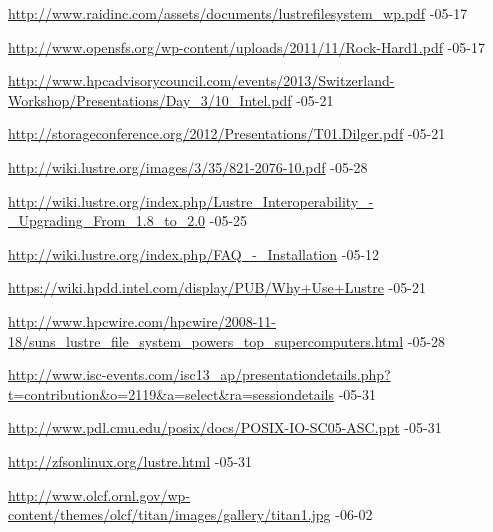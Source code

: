\begin{thebibliography}{1}
    \small

        \url{http://www.raidinc.com/assets/documents/lustrefilesystem_wp.pdf} -05-17

        \url{http://www.opensfs.org/wp-content/uploads/2011/11/Rock-Hard1.pdf} -05-17

        \url{http://www.hpcadvisorycouncil.com/events/2013/Switzerland-Workshop/Presentations/Day_3/10_Intel.pdf} -05-21

        \url{http://storageconference.org/2012/Presentations/T01.Dilger.pdf} -05-21

        \url{http://wiki.lustre.org/images/3/35/821-2076-10.pdf} -05-28

        \url{http://wiki.lustre.org/index.php/Lustre_Interoperability_-_Upgrading_From_1.8_to_2.0} -05-25

        \url{http://wiki.lustre.org/index.php/FAQ_-_Installation} -05-12

        \url{https://wiki.hpdd.intel.com/display/PUB/Why+Use+Lustre} -05-21

        \url{http://www.hpcwire.com/hpcwire/2008-11-18/suns_lustre_file_system_powers_top_supercomputers.html} -05-28

        \url{http://www.isc-events.com/isc13_ap/presentationdetails.php?t=contribution&o=2119&a=select&ra=sessiondetails} -05-31

        \url{http://www.pdl.cmu.edu/posix/docs/POSIX-IO-SC05-ASC.ppt} -05-31

        \url{http://zfsonlinux.org/lustre.html} -05-31

        \url{http://www.olcf.ornl.gov/wp-content/themes/olcf/titan/images/gallery/titan1.jpg} -06-02

\end{thebibliography}
